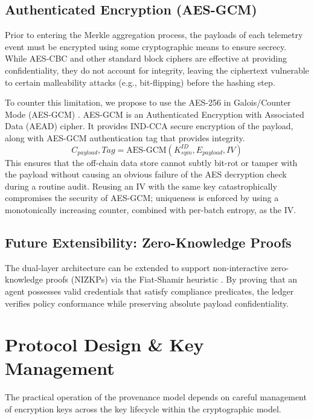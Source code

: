 \documentclass[conference]{IEEEtran}
\begin{document}
\subsection{Authenticated Encryption (AES-GCM)}

Prior to entering the Merkle aggregation process, the payloads of each telemetry event must be encrypted using some cryptographic means to ensure secrecy. While AES-CBC and other standard block ciphers are effective at providing confidentiality, they do not account for integrity, leaving the ciphertext vulnerable to certain malleability attacks (e.g., bit-flipping) before the hashing step.

To counter this limitation, we propose to use the AES-256 in Galois/Counter Mode (AES-GCM) \cite{b14}. AES-GCM is an Authenticated Encryption with Associated Data (AEAD) cipher. It provides IND-CCA secure encryption of the payload, along with AES-GCM authentication tag that provides integrity.
\begin{equation}
C_{payload}, Tag = \text{AES-GCM}(K_{sym}^{ID}, E_{payload}, IV)
\end{equation}
This ensures that the off-chain data store cannot subtly bit-rot or tamper with the payload without causing an obvious failure of the AES decryption check during a routine audit. Reusing an IV with the same key catastrophically compromises the security of AES-GCM; uniqueness is enforced by using a monotonically increasing counter, combined with per-batch entropy, as the IV.

\subsection{Future Extensibility: Zero-Knowledge Proofs}
The dual-layer architecture can be extended to support non-interactive zero-knowledge proofs (NIZKPs) via the Fiat-Shamir heuristic \cite{b29}. By proving that an agent possesses valid credentials that satisfy compliance predicates, the ledger verifies policy conformance while preserving absolute payload confidentiality.

\section{Protocol Design \& Key Management}

The practical operation of the provenance model depends on careful management of encryption keys across the key lifecycle within the cryptographic model.
\end{document}
